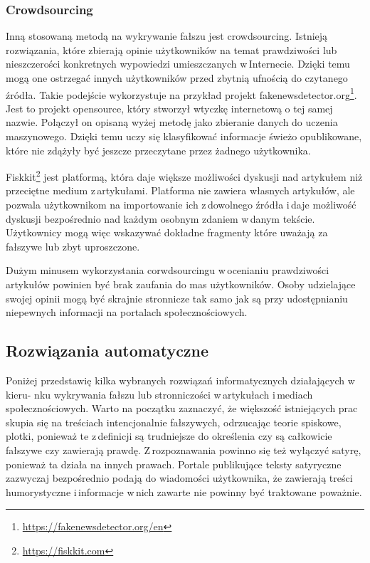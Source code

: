 \subsubsection{Crowdsourcing}
Inną stosowaną metodą na wykrywanie fałszu jest crowdsourcing. Istnieją rozwiązania, które zbierają opinie użytkowników na temat prawdziwości lub nieszczerości konkretnych wypowiedzi umieszczanych w\,Internecie. Dzięki temu mogą one ostrzegać innych użytkowników przed zbytnią ufnością do czytanego źródła. Takie podejście wykorzystuje na przykład projekt fakenewsdetector.org\footnote{\url{https://fakenewsdetector.org/en}}. Jest to projekt opensource, który stworzył wtyczkę internetową o tej samej nazwie. Połączył on opisaną wyżej metodę jako zbieranie danych do uczenia maszynowego. Dzięki temu uczy się klasyfikować informacje świeżo opublikowane, które nie zdążyły być jeszcze przeczytane przez żadnego użytkownika. 
\par Fiskkit\footnote{\url{https://fiskkit.com}} jest platformą, która daje większe możliwości dyskusji nad artykułem niż przeciętne medium z\,artykułami. Platforma nie zawiera własnych artykułów, ale pozwala użytkownikom na importowanie ich z\,dowolnego źródła i\,daje możliwość dyskusji bezpośrednio nad każdym osobnym zdaniem w\,danym tekście. Użytkownicy mogą więc wskazywać dokładne fragmenty które uważają za fałszywe lub zbyt uproszczone.
\par Dużym minusem wykorzystania corwdsourcingu w\,ocenianiu prawdziwości artykułów powinien być brak zaufania do mas użytkowników. Osoby udzielające swojej opinii mogą być skrajnie stronnicze tak samo jak są przy udostępnianiu niepewnych informacji na portalach społecznościowych.

\subsection{Rozwiązania automatyczne}
Poniżej przedstawię kilka wybranych rozwiązań informatycznych działających w\,kieru- nku wykrywania fałszu lub stronniczości w\,artykułach i\,mediach społecznościowych. 
Warto na początku zaznaczyć, że większość istniejących prac skupia się na treściach intencjonalnie fałszywych, odrzucając teorie spiskowe, plotki, ponieważ te z\,definicji są trudniejsze do określenia czy są całkowicie fałszywe czy zawierają prawdę. Z\,rozpoznawania powinno się też wyłączyć satyrę, ponieważ ta działa na innych prawach. Portale publikujące teksty satyryczne zazwyczaj bezpośrednio podają do wiadomości użytkownika, że zawierają treści humorystyczne i\,informacje w\,nich zawarte nie powinny być traktowane poważnie.


